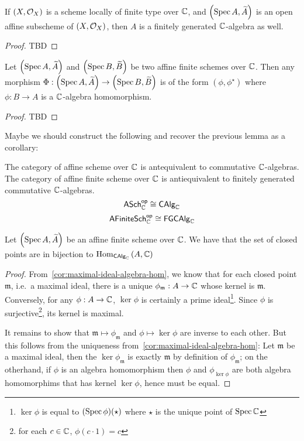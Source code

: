 \begin{proposition}
  If $\left(X, \mathcal{O}_{X}\right)$ is a scheme locally of finite type over $\mathbb{C}$, and $\left(\operatorname*{Spec}{A}, \widetilde{A}\right)$ is an open affine subscheme of $\left(X, \mathcal{O}_{X}\right)$, then $A$ is a finitely generated $\mathbb{C}$-algebra as well.
\end{proposition}

\begin{proof}
  TBD %
\end{proof}

\begin{proposition}
  Let $\left(\operatorname*{Spec}{A}, \widetilde{A}\right)$ and $\left(\operatorname*{Spec}{B}, \widetilde{B}\right)$ be two affine finite schemes over $\mathbb{C}$. Then any morphism $\Phi : \left(\operatorname*{Spec}{A}, \widetilde{A}\right) \to \left(\operatorname*{Spec}{B}, \widetilde{B}\right)$ is of the form $(\phi, \phi^{\star})$ where $\phi : B \to A$ is a $\mathbb{C}$-algebra homomorphism.
\end{proposition}

\begin{proof}
  TBD %
\end{proof}

Maybe we should construct the following and recover the previous lemma as a corollary:
\begin{proposition}
  The category of affine scheme over $\mathbb{C}$ is antequivalent to commutative $\mathbb{C}$-algebras.
  The category of affine finite scheme over $\mathbb{C}$ is antiequivalent to finitely generated commutative $\mathbb{C}$-algebras.
  \[
    \mathsf{ASch}_{\mathbb{C}}^{\mathsf{op}}\cong \mathsf{CAlg}_{\mathbb{C}}
  \]
  \[
    \mathsf{AFiniteSch}_{\mathbb{C}}^{\mathsf{op}}\cong \mathsf{FGCAlg}_{\mathbb{C}}
  \]
\end{proposition}

\begin{proposition}\label{thm:affine-scheme-closed-points-biject-algebra-hom}
  Let $\left(\operatorname*{Spec}{A}, \widetilde{A}\right)$ be an affine finite scheme over $\mathbb{C}$. We have that the set of closed points are in bijection to
  $\operatorname{Hom}_{\mathsf{CAlg}_{\mathbb{C}}}\left(A, \mathbb{C}\right)$
\end{proposition}

\begin{proof}
  From~\cref{cor:maximal-ideal-algebra-hom}, we know that for each closed point $\mathfrak m$, i.e.\ a maximal ideal, there is a unique $\phi_{\mathfrak m} : A \to \mathbb{C}$ whose kernel is $\mathfrak m$. Conversely, for any $\phi: A \to \mathbb{C}$, $\ker \phi$ is certainly a prime ideal\footnote{$\ker \phi$ is equal to $(\operatorname{Spec} \phi)(\star)$ where $\star$ is the unique point of $\operatorname{Spec}\mathbb{C}$}. Since $\phi$ is surjective\footnote{for each $c \in \mathbb{C}$, $\phi(c \cdot 1) = c$}, its kernel is maximal.


  It remains to show that $\mathfrak m \mapsto \phi_{\mathfrak{m}}$ and $\phi \mapsto \ker \phi$ are inverse to each other. But this follows from the uniqueness from~\cref{cor:maximal-ideal-algebra-hom}:
  Let $\mathfrak{m}$ be a maximal ideal, then the $\ker \phi_{\mathfrak{m}}$ is exactly $\mathfrak m$ by definition of $\phi_{\mathfrak m}$;
  on the otherhand, if $\phi$ is an algebra homomorphism then $\phi$ and $\phi_{\ker \phi}$ are both algebra homomorphims that has kernel $\ker \phi$, hence must be equal.
\end{proof}

